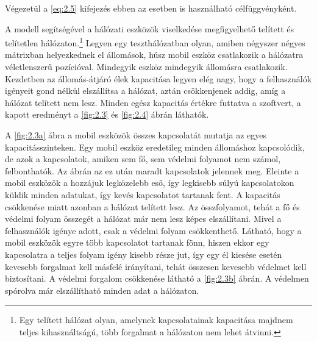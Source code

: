 \documentclass[a4paper,oneside]{article}
\begin{document}
Végezetül a \eqref{eq:2.5} kifejezés ebben az esetben is használható célfüggvényként.

\newpage

A modell segítségével a hálózati eszközök viselkedése megfigyelhető telített és telítetlen hálózaton.\footnote{
  Egy telített hálózat olyan, amelynek kapcsolatainak kapacitása majdnem teljes kihasználtságú,
  több forgalmat a hálózaton nem lehet átvinni.
}
Legyen egy teszthálózatban olyan, amiben négyszer négyes mátrixban helyezkednek el állomások,
húsz mobil eszköz csatlakozik a hálózatra véletlenszerű pozícióval.
Mindegyik eszköz mindegyik állomásra csatlakozik.
Kezdetben az állomás-átjáró élek kapacitása legyen elég nagy, hogy a felhasználók igényeit gond nélkül elszállítsa a hálózat,
aztán csökkenjenek addig, amíg a hálózat telített nem lesz.
Minden egész kapacitás értékre futtatva a szoftvert,
a kapott eredményt a \ref{fig:2.3} és \ref{fig:2.4} ábrán láthatók.

A \ref{fig:2.3a} ábra a mobil eszközök összes kapcsolatát mutatja az egyes kapacitásszinteken.
Egy mobil eszköz eredetileg minden állomáshoz kapcsolódik, de azok a kapcsolatok,
amiken sem fő, sem védelmi folyamot nem számol, felbonthatók.
Az ábrán az ez után maradt kapcsolatok jelennek meg. Eleinte a mobil eszközök a hozzájuk legközelebb eső, így legkisebb súlyú kapcsolatokon küldik minden adatukat,
így kevés kapcsolatot tartanak fent.
A kapacitás csökkenése miatt azonban a hálózat telített lesz.
Az összfolyamot, tehát a fő és védelmi folyam összegét a hálózat már nem lesz képes elszállítani.
Mivel a felhasználók igénye adott, csak a védelmi folyam csökkenthető.
Látható, hogy a mobil eszközök egyre több kapcsolatot tartanak fönn,
hiszen ekkor egy kapcsolatra a teljes folyam igény kisebb része jut,
így egy él kiesése esetén kevesebb forgalmat kell másfelé irányítani,
tehát összesen kevesebb védelmet kell biztosítani.
A védelmi forgalom csökkenése látható a \ref{fig:2.3b} ábrán.
A védelmen spórolva már elszállítható minden adat a hálózaton.
\end{document}

